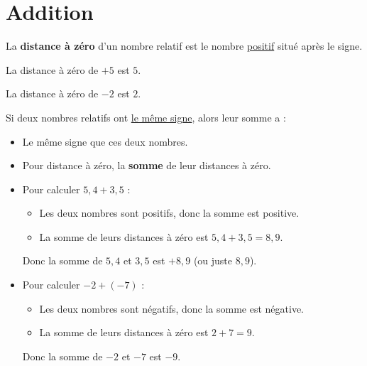 \documentclass[../€Cours-complet/Cours-complet]{subfiles}
\begin{document}
\maketitleCours

\section{Addition}

\begin{greybox}[frametitle={Rappel}]
	La \textbf{distance à zéro} d'un nombre relatif est le nombre \uline{positif} situé après le signe.
\end{greybox}

\begin{exemple}
	La distance à zéro de $+5$ est $5$.

	La distance à zéro de $-2$ est $2$.
\end{exemple}

\begin{cours}
	Si deux nombres relatifs ont \uline{le même signe}, alors leur somme a :
	\begin{itemize}
		\item Le même signe que ces deux nombres.
		\item Pour distance à zéro, la \textbf{somme} de leur distances à zéro.
	\end{itemize}
\end{cours}


\begin{exemple}
	\begin{itemize}
		\item Pour calculer $5,4 + 3,5$ :
		      \begin{itemize}
			      \item Les deux nombres sont positifs, donc la somme est positive.
			      \item La somme de leurs distances à zéro est $5,4 + 3,5 = 8,9$.
		      \end{itemize}
		      Donc la somme de $5,4$ et $3,5$ est $+8,9$ (ou juste $8,9$).
		\item Pour calculer $-2 + (-7)$ :
		      \begin{itemize}
			      \item Les deux nombres sont négatifs, donc la somme est négative.
			      \item La somme de leurs distances à zéro est $2 + 7 = 9$.
		      \end{itemize}
		      Donc la somme de $-2$ et $-7$ est $-9$.
	\end{itemize}
\end{exemple}
\end{document}
